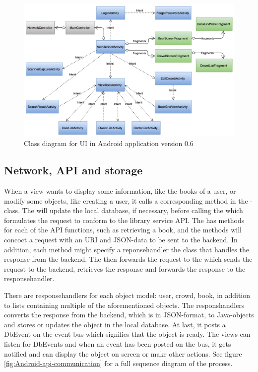 \begin{figure}
    \centering
    \includegraphics[width=\textwidth,keepaspectratio,origin=c]{figs/v06/Android/AndroidUIClassDiagram.png}
    \caption{Class diagram for UI in Android application version 0.6}
    \label{fig:AndroidUIClassDiagram}
\end{figure}

\subsection{Network, API and storage}
When a view wants to display some information, like the books of a user, or modify some objects, like creating a user, it calls a corresponding method in the -class. The  will update the local database, if necessary, before calling the  which formulates the request to conform to the library service \gls{API}. The  has methods for each of the \gls{API} functions, such as retrieving a book, and the methods will concoct a request with an URI and JSON-data to be sent to the backend. In addition, each method might specify a reponsehandler \textemdash  the class that handles the response from the backend. The  then forwards the request to the   which sends the request to the backend, retrieves the response and forwards the response to the responsehandler. 

There are responsehandlers for each object model: user, crowd, book, in addition to lists containing multiple of the aforementioned objects. The responshandlers converts the response from the backend, which is in JSON-format, to Java-objects and stores or updates the object in the local database.\cite{json} At last, it posts a DbEvent on the event bus which signifies that the object is ready. The views can listen for DbEvents and when an event has been posted on the bus, it gets notified and can display the object on screen or make other actions. See figure \ref{fig:Android-api-communication} for a full sequence diagram of the process. 
 
